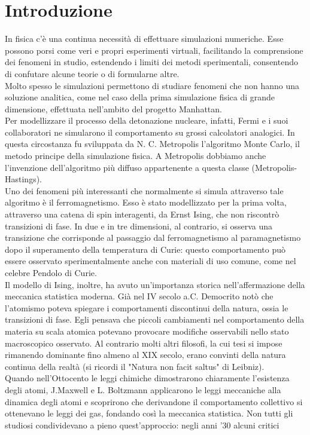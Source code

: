 \documentclass[Lau, noexaminfo, oneside]{sapthesis} %
\begin{document}
\chapter{Introduzione}
In fisica c'è una continua necessità di effettuare simulazioni numeriche. Esse possono porsi come veri e propri esperimenti virtuali, facilitando la comprensione dei fenomeni in studio, estendendo i limiti dei metodi sperimentali, consentendo di confutare alcune teorie o di formularne altre. \\
Molto spesso le simulazioni permettono di studiare fenomeni che non hanno una soluzione analitica, come nel caso della prima simulazione fisica di grande dimensione, effettuata nell'ambito del progetto Manhattan. \\
Per modellizzare il processo della detonazione nucleare, infatti, Fermi e i suoi collaboratori ne simularono il comportamento su grossi calcolatori analogici. In questa circostanza fu sviluppata da N. C. Metropolis l'algoritmo Monte Carlo, il metodo principe della simulazione fisica. A Metropolis dobbiamo anche l'invenzione dell'algoritmo più diffuso appartenente a questa classe (Metropolis-Hastings).\\
Uno dei fenomeni più interessanti che normalmente si simula attraverso tale algoritmo è il ferromagnetismo. Esso è stato modellizzato per la prima volta, attraverso una catena di spin interagenti, da Ernst Ising, che non riscontrò transizioni di fase. In due e in tre dimensioni, al contrario, si osserva una transizione che corrisponde al passaggio dal ferromagnetismo al paramagnetismo dopo il superamento della temperatura di Curie: questo comportamento può essere osservato sperimentalmente anche con materiali di uso comune, come nel celebre Pendolo di Curie. \\
Il modello di Ising, inoltre, ha avuto un'importanza storica nell'affermazione della meccanica statistica moderna.
Già nel IV secolo a.C. Democrito notò che l'atomismo poteva spiegare i comportamenti discontinui della natura, ossia le transizioni di fase. Egli pensava che piccoli cambiamenti nel comportamento della materia su scala atomica potevano provocare modifiche osservabili nello stato macroscopico osservato. 
Al contrario molti altri filosofi, la cui tesi si impose rimanendo dominante fino almeno al XIX secolo, erano convinti della natura continua della realtà (si ricordi il "Natura non facit saltus" di Leibniz). \\
Quando nell'Ottocento le leggi chimiche dimostrarono chiaramente l'esistenza degli atomi, J.Maxwell e L. Boltzmann applicarono le leggi meccaniche alla dinamica degli atomi e scoprirono che derivandone il comportamento collettivo si ottenevano le leggi dei gas, fondando così la meccanica statistica. Non tutti gli studiosi condividevano a pieno quest'approccio: negli anni '30 alcuni critici
\end{document}

